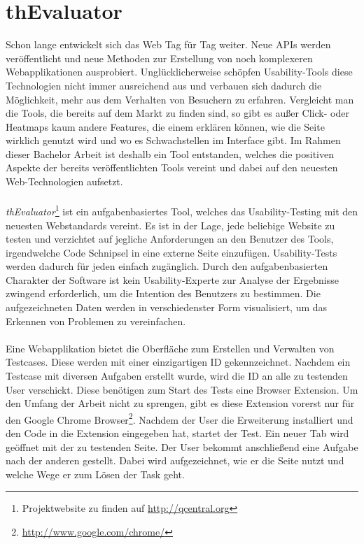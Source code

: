 %
%
%
%

\chapter{thEvaluator}

Schon lange entwickelt sich das Web Tag für Tag weiter. Neue APIs werden veröffentlicht und neue Methoden zur Erstellung von noch komplexeren Webapplikationen ausprobiert. Unglücklicherweise schöpfen Usability-Tools diese Technologien nicht immer ausreichend aus und verbauen sich dadurch die Möglichkeit, mehr aus dem Verhalten von Besuchern zu erfahren. Vergleicht man die Tools, die bereits auf dem Markt zu finden sind, so gibt es außer Click- oder Heatmaps kaum andere Features, die einem erklären können, wie die Seite wirklich genutzt wird und wo es Schwachstellen im Interface gibt. Im Rahmen dieser Bachelor Arbeit ist deshalb ein Tool entstanden, welches die positiven Aspekte der bereits veröffentlichten Tools vereint und dabei auf den neuesten Web-Technologien aufsetzt.\\
\\
\textit{thEvaluator}\footnote{Projektwebsite zu finden auf \url{http://qcentral.org}} ist ein aufgabenbasiertes Tool, welches das Usability-Testing mit den neuesten Webstandards vereint. Es ist in der Lage, jede beliebige Website zu testen und verzichtet auf jegliche Anforderungen an den Benutzer des Tools, irgendwelche Code Schnipsel in eine externe Seite einzufügen. Usability-Tests werden dadurch für jeden einfach zugänglich. Durch den aufgabenbasierten Charakter der Software ist kein Usability-Experte zur Analyse der Ergebnisse zwingend erforderlich, um die Intention des Benutzers zu bestimmen. Die aufgezeichneten Daten werden in verschiedenster Form visualisiert, um das Erkennen von Problemen zu vereinfachen.\\
\\
Eine Webapplikation bietet die Oberfläche zum Erstellen und Verwalten von Testcases. Diese werden mit einer einzigartigen ID gekennzeichnet. Nachdem ein Testcase mit diversen Aufgaben erstellt wurde, wird die ID an alle zu testenden User verschickt. Diese benötigen zum Start des Tests eine Browser Extension. Um den Umfang der Arbeit nicht zu sprengen, gibt es diese Extension vorerst nur für den Google Chrome Browser\footnote{\url{http://www.google.com/chrome/}}. Nachdem der User die Erweiterung installiert und den Code in die Extension eingegeben hat, startet der Test. Ein neuer Tab wird geöffnet mit der zu testenden Seite. Der User bekommt anschließend eine Aufgabe nach der anderen gestellt. Dabei wird aufgezeichnet, wie er die Seite nutzt und welche Wege er zum Lösen der Task geht.







